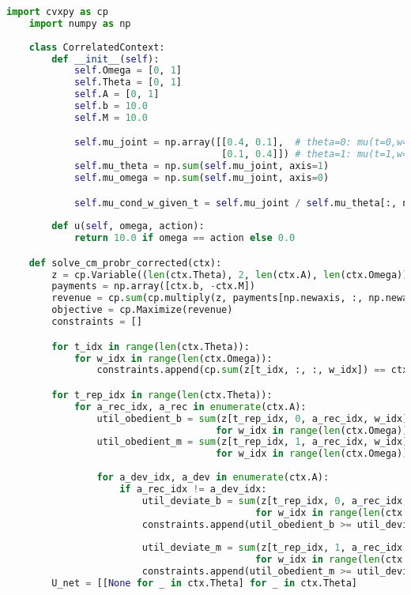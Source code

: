 \begin{lstlisting}[language=Python,style=pythonstyle]
    import cvxpy as cp
    import numpy as np
    
    class CorrelatedContext:
        def __init__(self):
            self.Omega = [0, 1]
            self.Theta = [0, 1]
            self.A = [0, 1]
            self.b = 10.0  
            self.M = 10.0  

            self.mu_joint = np.array([[0.4, 0.1],  # theta=0: mu(t=0,w=0), mu(t=0,w=1)
                                      [0.1, 0.4]]) # theta=1: mu(t=1,w=0), mu(t=1,w=1)
            self.mu_theta = np.sum(self.mu_joint, axis=1) 
            self.mu_omega = np.sum(self.mu_joint, axis=0) 

            self.mu_cond_w_given_t = self.mu_joint / self.mu_theta[:, np.newaxis]
    
        def u(self, omega, action):
            return 10.0 if omega == action else 0.0

    def solve_cm_probr_corrected(ctx):
        z = cp.Variable((len(ctx.Theta), 2, len(ctx.A), len(ctx.Omega)), nonneg=True)
        payments = np.array([ctx.b, -ctx.M])
        revenue = cp.sum(cp.multiply(z, payments[np.newaxis, :, np.newaxis, np.newaxis]))
        objective = cp.Maximize(revenue)
        constraints = []

        for t_idx in range(len(ctx.Theta)):
            for w_idx in range(len(ctx.Omega)):
                constraints.append(cp.sum(z[t_idx, :, :, w_idx]) == ctx.mu_joint[t_idx, w_idx])

        for t_rep_idx in range(len(ctx.Theta)):
            for a_rec_idx, a_rec in enumerate(ctx.A):
                util_obedient_b = sum(z[t_rep_idx, 0, a_rec_idx, w_idx] * ctx.u(ctx.Omega[w_idx], a_rec) 
                                     for w_idx in range(len(ctx.Omega)))
                util_obedient_m = sum(z[t_rep_idx, 1, a_rec_idx, w_idx] * ctx.u(ctx.Omega[w_idx], a_rec) 
                                     for w_idx in range(len(ctx.Omega)))
                
                for a_dev_idx, a_dev in enumerate(ctx.A):
                    if a_rec_idx != a_dev_idx:
                        util_deviate_b = sum(z[t_rep_idx, 0, a_rec_idx, w_idx] * ctx.u(ctx.Omega[w_idx], a_dev) 
                                            for w_idx in range(len(ctx.Omega)))
                        constraints.append(util_obedient_b >= util_deviate_b)
                        
                        util_deviate_m = sum(z[t_rep_idx, 1, a_rec_idx, w_idx] * ctx.u(ctx.Omega[w_idx], a_dev) 
                                            for w_idx in range(len(ctx.Omega)))
                        constraints.append(util_obedient_m >= util_deviate_m)
        U_net = [[None for _ in ctx.Theta] for _ in ctx.Theta]
    

\end{lstlisting}
